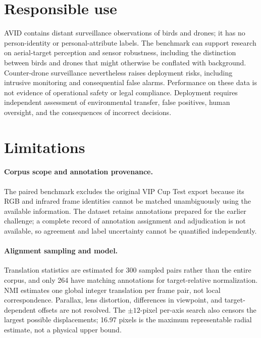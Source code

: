 \documentclass[10pt]{article}
\newcommand{\dataset}{\textsc{AVID}}
\begin{document}
\section{Responsible use}
\label{sec:responsible}

\dataset{} contains distant surveillance observations of birds and drones; it has no person-identity or personal-attribute labels. The benchmark can support research on aerial-target perception and sensor robustness, including the distinction between birds and drones that might otherwise be conflated with background. Counter-drone surveillance nevertheless raises deployment risks, including intrusive monitoring and consequential false alarms. Performance on these data is not evidence of operational safety or legal compliance. Deployment requires independent assessment of environmental transfer, false positives, human oversight, and the consequences of incorrect decisions.

\section{Limitations}
\label{sec:limitations}

\paragraph{Corpus scope and annotation provenance.}
The paired benchmark excludes the original VIP Cup Test export because its RGB and infrared frame identities cannot be matched unambiguously using the available information. The dataset retains annotations prepared for the earlier challenge; a complete record of annotation assignment and adjudication is not available, so agreement and label uncertainty cannot be quantified independently.

\paragraph{Alignment sampling and model.}
Translation statistics are estimated for 300 sampled pairs rather than the entire corpus, and only 264 have matching annotations for target-relative normalization. NMI estimates one global integer translation per frame pair, not local correspondence. Parallax, lens distortion, differences in viewpoint, and target-dependent offsets are not resolved. The $\pm12$-pixel per-axis search also censors the largest possible displacements; 16.97 pixels is the maximum representable radial estimate, not a physical upper bound.
\end{document}
